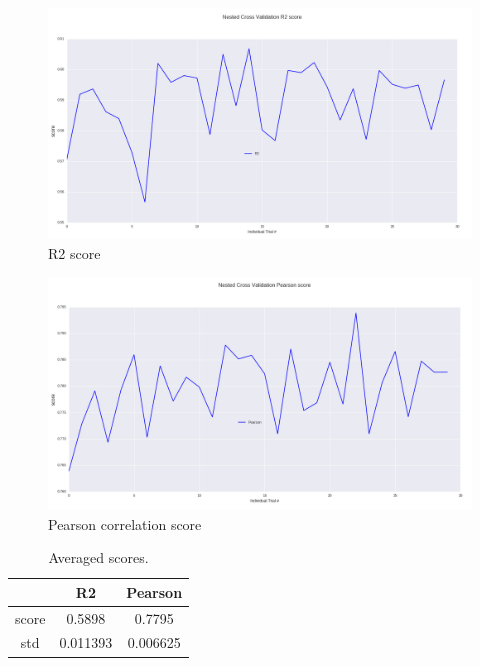 \documentclass[10pt, a4paper]{article}
\begin{document}
\begin{figure}[h!]
\begin{center}
	\centering
	\includegraphics[scale=0.36]{R2.png}
	\caption{R2 score}
\end{center}
\end{figure}


\begin{figure}[h!]
\begin{center}
	\centering
	\includegraphics[scale=0.36]{Pearson.png}
	\caption{Pearson correlation score}
\end{center}
\end{figure}

\begin{table}
\caption{Averaged scores.}
\label{tab:narrow-table}
\begin{center}
\begin{tabular}{ccc}
\toprule
& R2 & Pearson\\
\midrule
score & 0.5898 & 0.7795 \\
std & 0.011393 & 0.006625 \\
\bottomrule
\end{tabular}
\end{center}
\end{table}
\end{document}
